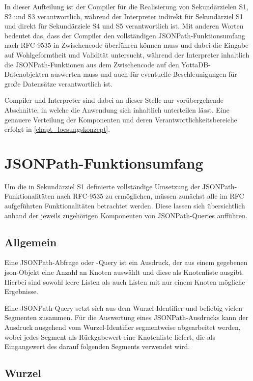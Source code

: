 \documentclass[oneside]{ausarbeitung}
\begin{document}
	In dieser Aufteilung ist der Compiler für die Realisierung von Sekundärzielen S1, S2 und S3 verantwortlich, während der Interpreter indirekt für Sekundärziel S1 und direkt für Sekundärziele S4 und S5 verantwortlich ist. Mit anderen Worten bedeutet das, dass der Compiler den vollständigen JSONPath-Funktionsumfang nach RFC-9535 in Zwischencode überführen können muss und dabei die Eingabe auf Wohlgeformtheit und Validität untersucht, während der Interpreter inhaltlich die JSONPath-Funktionen aus dem Zwischencode auf den YottaDB-Datenobjekten auswerten muss und auch für eventuelle Beschleunigungen für große Datensätze verantwortlich ist.
	
	Compiler und Interpreter sind dabei an dieser Stelle nur vorübergehende Abschnitte, in welche die Anwendung sich inhaltlich unterteilen lässt. Eine genauere Verteilung der Komponenten und deren Verantwortlichkeitsbereiche erfolgt in \ref{chapt_loesungskonzept}.
	
	
	
	\section{JSONPath-Funktionsumfang}
	Um die in Sekundärziel S1 definierte vollständige Umsetzung der JSONPath-Funktionalitäten nach RFC-9535 zu ermöglichen, müssen zunächst alle im RFC aufgeführten Funktionalitäten betrachtet werden. Diese lassen sich übersichtlich anhand der jeweils zugehörigen Komponenten von JSONPath-Queries aufführen.
	
	\subsection{Allgemein}
	
	Eine JSONPath-Abfrage oder -Query ist ein Ausdruck, der aus einem gegebenen \ac{json}-Objekt eine Anzahl an Knoten auswählt und diese als Knotenliste ausgibt. Hierbei sind sowohl leere Listen als auch Listen mit nur einem Knoten mögliche Ergebnisse.
	
	Eine JSONPath-Query setzt sich aus dem Wurzel-Identifier und beliebig vielen Segmenten zusammen. Für die Auswertung eines JSONPath-Ausdrucks kann der Ausdruck ausgehend vom Wurzel-Identifier segmentweise abgearbeitet werden, wobei jedes Segment als Rückgabewert eine Knotenliste liefert, die als Eingangswert des darauf folgenden Segments verwendet wird. 

	
	\subsection{Wurzel}
	
\end{document}
